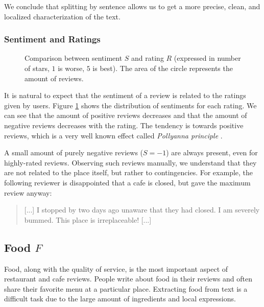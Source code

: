 We conclude that splitting by sentence allows us to get a more precise, clean, and localized characterization of the text.

\subsubsection{Sentiment and Ratings}

\begin{figure}
\begin{center}

\caption{Comparison between sentiment $S$ and rating $R$ (expressed in number of stars, $1$ is worse, $5$ is best). The area of the circle represents the amount of reviews.}
\label{fig:review_stars_vs_sentiment_rounded}
\end{center}
\end{figure}


It is natural to expect that the sentiment of a review is related to the ratings given by users.
Figure \ref{fig:review_stars_vs_sentiment_rounded} shows the distribution of sentiments for each rating. 
We can see that the amount of positive reviews decreases and that the amount of negative reviews decreases with the rating. 
The tendency is towards positive reviews, which is a very well known effect called \emph{Pollyanna principle} \cite{boucher1969pollyanna}.

A small amount of purely negative reviews ($S = -1$) are always present, even for highly-rated reviews. Observing such reviews manually, we understand that they are not related to the place itself, but rather to contingencies. 
For example, the following reviewer is disappointed that a cafe is closed, but gave the maximum review anyway:
\begin{quote}
	[...] I stopped by two days ago unaware that they had closed.  I am severely bummed. This place is irreplaceable! [...] 
\end{quote}

\subsection{Food $F$}
Food, along with the quality of service, is the most important aspect of restaurant and cafe reviews. People write about food in their reviews and often share their favorite menu at a particular place. Extracting food from text is a difficult task due to the large amount of ingredients and local expressions.

